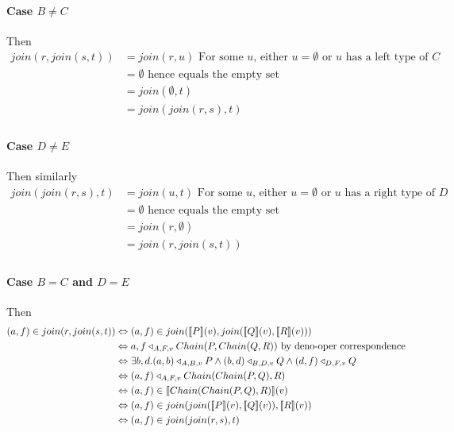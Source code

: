 \documentclass[twoside,a4paper,11pt]{article}
\newcommand{\db}[1]{{\bf [\![}#1{\bf ]\!]}}
\newcommand{\deno}[1]{\db{#1}(v)}
\newcommand{\denoRule}[2]{#1 \in \deno{#2}}
\newcommand{\opRule}[3]{#1 \triangleleft_{#2, v} #3}
\begin{document}
\paragraph{Case $B \neq C$}
	Then 
	\begin{equation}\label{Case B != C}
	\begin{split}
		join(r, join(s, t)) & = join(r, u) \mbox{ For some $u$, either $u = \emptyset$ or $u$ has a left type of $C$}\\
							& = \emptyset \mbox{ hence equals the empty set}\\
							& = join(\emptyset, t)\\
							& = join(join(r, s), t) \\
	\end{split}
	\end{equation}
	
\paragraph{Case $D \neq E$}
Then similarly
	\begin{equation}\label{Case D != E}
	\begin{split}
		join(join(r, s), t) & = join(u, t) \mbox{ For some $u$, either $u = \emptyset$ or $u$ has a right type of $D$}\\
							& = \emptyset \mbox{ hence equals the empty set}\\
							& = join(r, \emptyset)\\
							& = join(r, join(s, t)) \\
	\end{split}
	\end{equation}
	
\paragraph{Case $B = C$ and $D = E$}
Then
\begin{equation}\label{Well typed}
\begin{split}
(a, f) \in join(r, join(s, t)) & \Leftrightarrow (a, f) \in join(\deno{P}, join(\deno{Q},\deno{R}))\\
							  & \Leftrightarrow \opRule{a,f}{A, F}{Chain(P, Chain(Q, R))} \mbox{ by deno-oper correspondence}\\
							& \Leftrightarrow \exists b, d. \opRule{(a, b)}{A, B}{P} \wedge \opRule{(b,d)}{B,D}{Q} \wedge \opRule{(d,f)}{D,F}{Q}\\
							& \Leftrightarrow \opRule{(a, f)}{A, F}{Chain(Chain(P, Q), R)}\\
							& \Leftrightarrow \denoRule{(a, f)}{Chain(Chain(P, Q), R)}\\
							& \Leftrightarrow (a, f) \in join(join(\deno{P}, \deno{Q}), \deno{R})\\
							& \Leftrightarrow (a, f) \in join(join(r, s), t)\\							
\end{split}
\end{equation}
\end{document}
